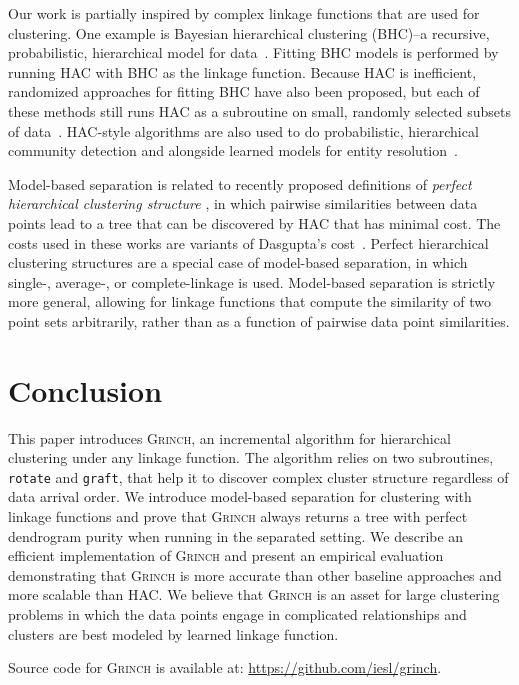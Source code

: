 \documentclass{article} \usepackage[utf8]{inputenc} \usepackage[T1]{fontenc}    \usepackage{hyperref}       \usepackage{url}            \usepackage{booktabs}       \usepackage{amsfonts}       \usepackage{nicefrac}       \usepackage{microtype}      \usepackage{geometry}
\newcommand{\alg}{\textsc{Grinch}\xspace}
\newcommand{\records}{data points\xspace}
\newcommand{\hac}{\textsc{HAC}\xspace}
\newcommand{\graft}{\texttt{graft}\xspace}
\newcommand{\rotate}{\texttt{rotate}\xspace}
\newcommand{\hof}{linkage function\xspace}
\newcommand{\hofs}{linkage functions\xspace}
\begin{document}
Our work is partially inspired by complex \hofs that are used for
clustering. One example is Bayesian hierarchical clustering (BHC)--a
recursive, probabilistic, hierarchical model for
data~\cite{heller2005bayesian}. Fitting BHC models is performed by
running \hac with BHC as the \hof.  Because \hac is inefficient,
randomized approaches for fitting BHC have also been proposed, but
each of these methods still runs \hac as a subroutine on small,
randomly selected subsets of
data~\cite{heller2005randomized}. \hac-style algorithms are also used
to do probabilistic, hierarchical community detection and alongside
learned models for entity resolution~\cite{blundell2013bayesian,
  lee2012joint}.

Model-based separation is related to recently proposed definitions of
\emph{perfect hierarchical clustering structure}
\cite{cohen2018hierarchical,wang2018improved}, in which pairwise
similarities between data points lead to a tree that can be discovered
by \hac that has minimal cost. The costs used in these works are
variants of Dasgupta's cost~\cite{dasgupta2015cost}. Perfect
hierarchical clustering structures are a special case of model-based
separation, in which single-, average-, or complete-linkage is
used. Model-based separation is strictly more general, allowing for
linkage functions that compute the similarity of two point sets
arbitrarily, rather than as a function of pairwise data point
similarities.
 \section{Conclusion}
\label{sec:conclusion}
This paper introduces \alg, an incremental algorithm for hierarchical
clustering under any \hof. The algorithm relies on two subroutines,
\rotate and \graft, that help it to discover complex cluster structure
regardless of data arrival order. We introduce model-based separation
for clustering with \hofs and prove that \alg always returns a tree
with perfect dendrogram purity when running in the separated setting.
We describe an efficient implementation of \alg and present an
empirical evaluation demonstrating that \alg is more accurate than
other baseline approaches and more scalable than \hac. We believe that
\alg is an asset for large clustering problems in which the
\records engage in complicated relationships and clusters are best
modeled by learned \hof.

Source code for \alg is available at: \url{https://github.com/iesl/grinch}. 
\newpage
\end{document}
